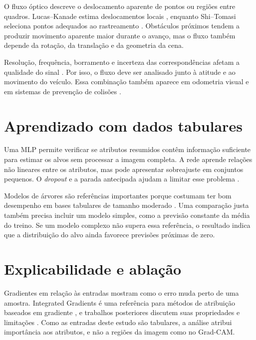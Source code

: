 O fluxo óptico descreve o deslocamento aparente de pontos ou regiões entre quadros. Lucas--Kanade estima deslocamentos locais \cite{LucasKanade1981}, enquanto Shi--Tomasi seleciona pontos adequados ao rastreamento \cite{ShiTomasi1994}. Obstáculos próximos tendem a produzir movimento aparente maior durante o avanço, mas o fluxo também depende da rotação, da translação e da geometria da cena.

Resolução, frequência, borramento e incerteza das correspondências afetam a qualidade do sinal \cite{SimoneGodio2022,Peidong2021,Estimation2109}. Por isso, o fluxo deve ser analisado junto à atitude e ao movimento do veículo. Essa combinação também aparece em odometria visual e em sistemas de prevenção de colisões \cite{Tarrio2015,Garcia2016,Xiao2021}.

\section{Aprendizado com dados tabulares}

Uma MLP permite verificar se atributos resumidos contêm informação suficiente para estimar os alvos sem processar a imagem completa. A rede aprende relações não lineares entre os atributos, mas pode apresentar sobreajuste em conjuntos pequenos. O \textit{dropout} e a parada antecipada ajudam a limitar esse problema \cite{Srivastava2014,Prechelt1998}.

Modelos de árvores são referências importantes porque costumam ter bom desempenho em bases tabulares de tamanho moderado \cite{OyallonandGaelVaroquaux5220}. Uma comparação justa também precisa incluir um modelo simples, como a previsão constante da média do treino. Se um modelo complexo não supera essa referência, o resultado indica que a distribuição do alvo ainda favorece previsões próximas de zero.

\section{Explicabilidade e ablação}

Gradientes em relação às entradas mostram como o erro muda perto de uma amostra. Integrated Gradients é uma referência para métodos de atribuição baseados em gradiente \cite{Sundararajan2017}, e trabalhos posteriores discutem suas propriedades e limitações \cite{Walker5289,Axiomatic2025}. Como as entradas deste estudo são tabulares, a análise atribui importância aos atributos, e não a regiões da imagem como no Grad-CAM.

